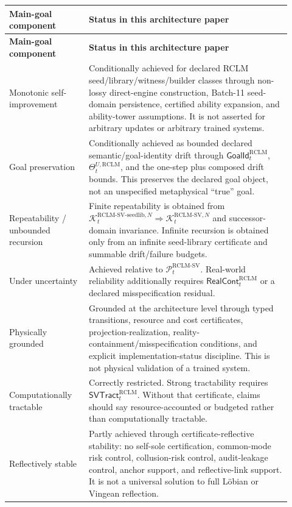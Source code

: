 \documentclass[11pt,a4paper]{article}
\newcommand{\Pcal}{\mathcal P}
\newcommand{\Kcal}{\mathcal K}
\newcommand{\RCLM}{\mathrm{RCLM}}
\begin{document}
\begin{longtable}{@{}p{0.26\linewidth}p{0.66\linewidth}@{}}
\toprule
\textbf{Main-goal component} & \textbf{Status in this architecture paper}\\
\midrule
\endfirsthead
\toprule
\textbf{Main-goal component} & \textbf{Status in this architecture paper}\\
\midrule
\endhead
\bottomrule
\endfoot
Monotonic self-improvement & Conditionally achieved for declared RCLM seed/library/witness/builder classes through non-lossy direct-engine construction, Batch-11 seed-domain persistence, certified ability expansion, and ability-tower assumptions.  It is not asserted for arbitrary updates or arbitrary trained systems.\\
Goal preservation & Conditionally achieved as bounded declared semantic/goal-identity drift through \(\mathsf{GoalId}_t^{\RCLM}\), \(\Theta_t^{U,\RCLM}\), and the one-step plus composed drift bounds.  This preserves the declared goal object, not an unspecified metaphysical ``true'' goal.\\
Repeatability / unbounded recursion & Finite repeatability is obtained from \(\Kcal_t^{\RCLM\text{-}\mathrm{SV\mbox{-}seedlib},N}\Rightarrow\Kcal_t^{\RCLM\text{-}\mathrm{SV},N}\) and successor-domain invariance.  Infinite recursion is obtained only from an infinite seed-library certificate and summable drift/failure budgets.\\
Under uncertainty & Achieved relative to \(\Pcal_t^{\RCLM\text{-}\mathrm{SV}}\).  Real-world reliability additionally requires \(\mathsf{RealCont}_t^{\RCLM}\) or a declared misspecification residual.\\
Physically grounded & Grounded at the architecture level through typed transitions, resource and cost certificates, projection-realization, reality-containment/misspecification conditions, and explicit implementation-status discipline.  This is not physical validation of a trained system.\\
Computationally tractable & Correctly restricted.  Strong tractability requires \(\mathsf{SVTract}_t^{\RCLM}\).  Without that certificate, claims should say resource-accounted or budgeted rather than computationally tractable.\\
Reflectively stable & Partly achieved through certificate-reflective stability: no self-sole certification, common-mode risk control, collusion-risk control, audit-leakage control, anchor support, and reflective-link support.  It is not a universal solution to full L\"obian or Vingean reflection.\\
\end{longtable}
\end{document}
